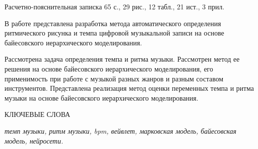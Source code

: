 
Расчетно-пояснительная записка 65 с., 29 рис., 12 табл., 21 ист., 3 прил.

В работе представлена разработка метода автоматического определения ритмического рисунка и темпа цифровой музыкальной записи на основе байесовского иерархического моделирования.

Рассмотрена задача определения темпа и ритма музыки. Рассмотрен метод ее решения на основе байесовского иерархического моделирования, его применимость при работе с музыкой разных жанров и разным составом инструментов. Представлена реализация метод оценки переменных темпа и ритма музыки на основе байесовского иерархического моделирования.

КЛЮЧЕВЫЕ СЛОВА

\textit{темп музыки, ритм музыки, bpm, вейвлет, марковская модель, байесовская модель, нейросети.}

\clearpage